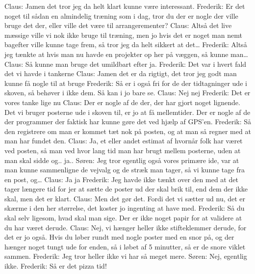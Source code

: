 Claus: Jamen det tror jeg da helt klart kunne være interessant.\newline
Frederik: Er det noget til sådan en almindelig træning som i dag, tror du der er nogle der ville bruge det der, eller ville det være til arrangerementer?\newline
Claus: Altså det live mæssige ville vi nok ikke bruge til træning, men jo hvis det er noget man nemt bagefter ville kunne tage frem, så tror jeg da helt sikkert at det… \newline
Frederik: Altså jeg tænkte at hvis man nu havde en projekter op her på væggen, så kunne man…\newline
Claus:  Så kunne man bruge det umildbart efter ja.\newline
Frederik: Det var i hvert fald det vi havde i tankerne\newline
Claus: Jamen det er da rigtigt, det tror jeg godt man kunne få nogle til at bruge\newline
Frederik: Så er i også fri for de der tidtagninger ude i skoven, så behøver i ikke dem. Så kan i jo bare se.\newline
Claus: Nej nej\newline
Frederik: Det er vores tanke lige nu\newline
Claus: Der er nogle af de der, der har gjort noget lignende. Det vi bruger posterne ude i skoven til, er jo at få mellemtider. Der er nogle af de der programmer der faktisk har kunne gøre det ved hjælp af GPS’en. \newline
Frederik: Så den registrere om man er kommet tæt nok på posten, og at man så regner med at man har fundet den.\newline
Claus: Ja, et eller andet estimat af hvornår folk har været ved posten, så man ved hvor lang tid man har brugt mellem posterne, uden at man skal sidde og.. ja..\newline
Søren: Jeg tror egentlig også vores primære ide, var at man kunne sammenligne de vejvalg og de stræk man tager, så vi kunne tage fra en post, og…\newline
Claus:  Ja ja\newline
Frederik:  Jeg havde ikke tænkt over den med at det tager længere tid for jer at sætte de poster ud der skal brik til, end dem der ikke skal, men det er klart. \newline
Claus: Men det gør det. Fordi det vi sætter ud nu, det er skærme i den her størrelse, det koster jo ingenting at have med. \newline
Frederik:  Så du skal selv ligesom, hvad skal man sige. Der er ikke noget papir for at validere at du har været derude. \newline
Claus: Nej, vi hænger heller ikke stifteklemmer derude, for det er jo også. Hvis du løber rundt med nogle poster med en snor på, og der hænger noget tungt ude for enden, så i løbet af 5 minutter, så er de snore viklet sammen.\newline
Frederik: Jeg tror heller ikke vi har så meget mere.\newline
Søren: Nej, egentlig ikke.\newline
Frederik: Så er det pizza tid!\newline 

